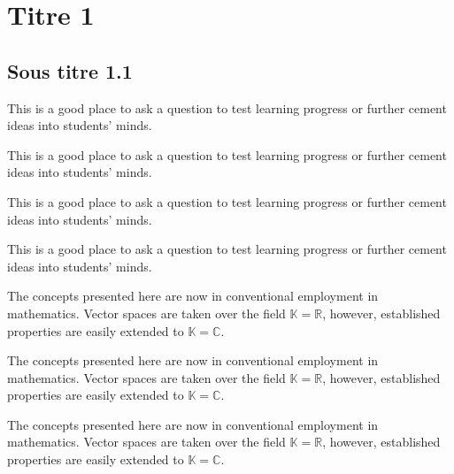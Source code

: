 \documentclass[10pt,fleqn]{article} %
\begin{document}


\newpage


\section{Titre 1}
\subsection{Sous titre 1.1}
\lipsum[1-2]

\begin{exercise}[toto]
This is a good place to ask a question to test learning progress or further cement ideas into students' minds.
\end{exercise}

\begin{resultat}[toto]
This is a good place to ask a question to test learning progress or further cement ideas into students' minds.
\end{resultat}

\begin{proposition}[toto]
This is a good place to ask a question to test learning progress or further cement ideas into students' minds.
\end{proposition}

\begin{hypo}[toto]
This is a good place to ask a question to test learning progress or further cement ideas into students' minds.
\end{hypo}


\begin{corollary}
The concepts presented here are now in conventional employment in mathematics. Vector spaces are taken over the field $\mathbb{K}=\mathbb{R}$, however, established properties are easily extended to $\mathbb{K}=\mathbb{C}$.
\end{corollary}

\begin{remark}
The concepts presented here are now in conventional employment in mathematics. Vector spaces are taken over the field $\mathbb{K}=\mathbb{R}$, however, established properties are easily extended to $\mathbb{K}=\mathbb{C}$.
\end{remark}

\begin{theorem}
The concepts presented here are now in conventional employment in mathematics. Vector spaces are taken over the field $\mathbb{K}=\mathbb{R}$, however, established properties are easily extended to $\mathbb{K}=\mathbb{C}$.
\end{theorem}
\end{document}
